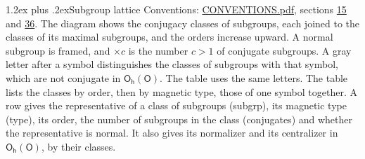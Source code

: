 \documentclass[10pt,a4paper]{article}
\makeatletter
\renewcommand\section{\@startsection{section}{1}{\z@}{-3ex plus -1ex minus -.2ex}%
  {1.2ex plus .2ex}{\normalfont\large\sffamily\bfseries\color{parttitle}}}
\numberwithin{equation}{section}
\newcommand{\grp}[1]{\mathsf{#1}}
\makeatother
\begin{document}
\section{Subgroup lattice}\label{s:subgroups}
Conventions: \href{../../CONVENTIONS.pdf}{CONVENTIONS.pdf}, sections \href{../../../rotation/CONVENTIONS.pdf\#conv.15}{15} and \href{../../CONVENTIONS.pdf\#conv.36}{36}.
The diagram shows the conjugacy classes of subgroups, each joined to the classes of its maximal subgroups, and the orders increase upward. \label{n:index.conjugates.c}\label{n:mark.conjugates}A normal subgroup is framed, and ${\times}c$ is the number $c > 1$ of conjugate subgroups. \label{n:mark.letter}A gray letter after a symbol distinguishes the classes of subgroups with that symbol, which are not conjugate in $\grp{O_{h}}(\grp{O})$. The table uses the same letters. The table lists the classes by order, then by magnetic type, those of one symbol together. \label{n:head.subgroup}\label{n:head.magnetic.type}\label{n:head.order}\label{n:head.conjugates}\label{n:head.normal}A row gives the representative of a class of subgroups (subgrp), its magnetic type (type), its order, the number of subgroups in the class (conjugates) and whether the representative is normal. \label{n:head.normalizer}\label{n:head.centralizer}It also gives its normalizer and its centralizer in $\grp{O_{h}}(\grp{O})$, by their classes. 
\end{document}

